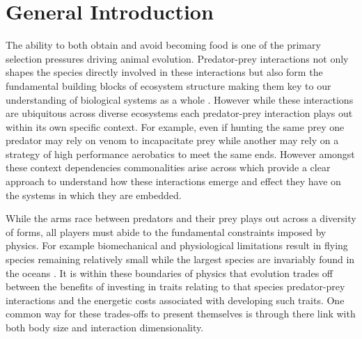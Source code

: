 \chapter{General Introduction}
\label{chap:introduction}%


\noindent
The ability to both obtain and avoid becoming food is one of the primary selection pressures driving animal evolution. Predator-prey interactions not only shapes the species directly involved in these interactions but also form the fundamental building blocks of ecosystem structure making them key to our understanding of biological systems as a whole \citep{pimm1984complexity,cohen1990community}. However while these interactions are ubiquitous across diverse ecosystems each predator-prey interaction plays out within its own specific context. For example, even if hunting the same prey one predator may rely on venom to incapacitate prey while another may rely on a strategy of high performance aerobatics to meet the same ends. However amongst these context dependencies commonalities arise across which provide a clear approach to understand how these interactions emerge and effect they have on the systems in which they are embedded.


While the arms race between predators and their prey plays out across a diversity of forms, all players must abide to the fundamental constraints imposed by physics. For example biomechanical and physiological limitations result in flying species remaining relatively small \citep{chatterjee2007aerodynamics,dudley2002mechanisms} while the largest species are invariably found in the oceans \citep{heim2015cope}. It is within these boundaries of physics that evolution trades off between the benefits of investing in traits relating to that species predator-prey interactions and the energetic costs associated with developing such traits. One common way for these trades-offs to present themselves is through there link with both body size and interaction dimensionality.


